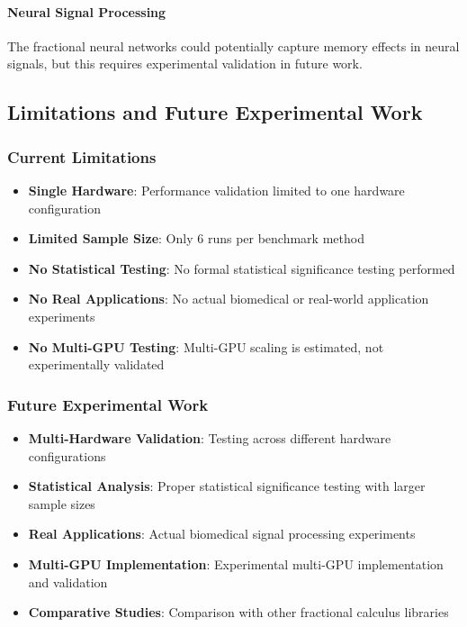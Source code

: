 \paragraph{Neural Signal Processing}
The fractional neural networks could potentially capture memory effects in neural signals, but this requires experimental validation in future work.

\subsection{Limitations and Future Experimental Work}

\subsubsection{Current Limitations}

\begin{itemize}
    \item \textbf{Single Hardware}: Performance validation limited to one hardware configuration
    \item \textbf{Limited Sample Size}: Only 6 runs per benchmark method
    \item \textbf{No Statistical Testing}: No formal statistical significance testing performed
    \item \textbf{No Real Applications}: No actual biomedical or real-world application experiments
    \item \textbf{No Multi-GPU Testing}: Multi-GPU scaling is estimated, not experimentally validated
\end{itemize}

\subsubsection{Future Experimental Work}

\begin{itemize}
    \item \textbf{Multi-Hardware Validation}: Testing across different hardware configurations
    \item \textbf{Statistical Analysis}: Proper statistical significance testing with larger sample sizes
    \item \textbf{Real Applications}: Actual biomedical signal processing experiments
    \item \textbf{Multi-GPU Implementation}: Experimental multi-GPU implementation and validation
    \item \textbf{Comparative Studies}: Comparison with other fractional calculus libraries
\end{itemize}

